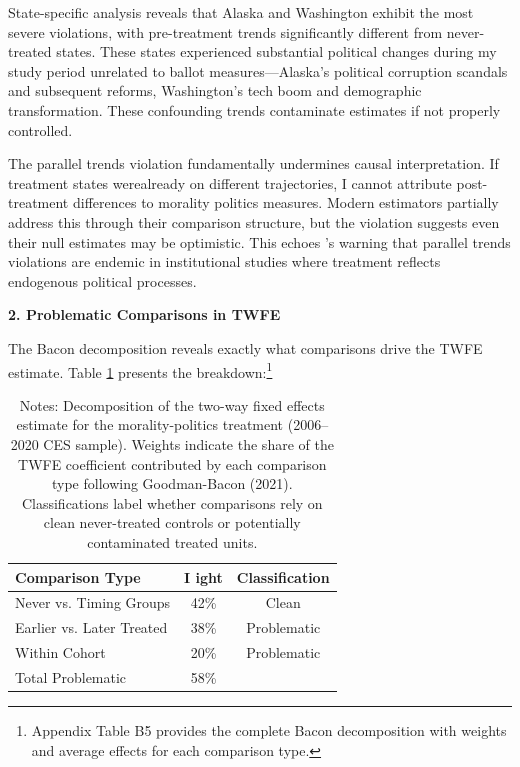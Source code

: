 \documentclass[12pt,letterpaper,oneside]{book}
\begin{document}
State-specific analysis reveals that Alaska and Washington exhibit the most severe violations, with pre-treatment trends significantly different from never-treated states. These states experienced substantial political changes during my study period unrelated to ballot measures---Alaska's political corruption scandals and subsequent reforms, Washington's tech boom and demographic transformation. These confounding trends contaminate estimates if not properly controlled.

The parallel trends violation fundamentally undermines causal interpretation. If treatment states werealready on different trajectories, I cannot attribute post-treatment differences to morality politics measures. Modern estimators partially address this through their comparison structure, but the violation suggests even their null estimates may be optimistic. This echoes \citet{kahn2020promise}'s warning that parallel trends violations are endemic in institutional studies where treatment reflects endogenous political processes.

\textbf{2. Problematic Comparisons in TWFE}

The Bacon decomposition reveals exactly what comparisons drive the TWFE estimate. Table \ref{tab:bacon_decomp} presents the breakdown:\footnote{Appendix Table B5 provides the complete Bacon decomposition with weights and average effects for each comparison type.}

\begin{table}[H]
\centering
\caption{Bacon Decomposition of TWFE Estimate}
\label{tab:bacon_decomp}
\caption*{\footnotesize Notes: Decomposition of the two-way fixed effects estimate for the morality-politics treatment (2006--2020 CES sample). Weights indicate the share of the TWFE coefficient contributed by each comparison type following Goodman-Bacon (2021). Classifications label whether comparisons rely on clean never-treated controls or potentially contaminated treated units.}
\begin{tabular}{lcc}
\hline\hline
Comparison Type & I ight & Classification \\
\hline
Never vs. Timing Groups & 42\% & Clean \\
Earlier vs. Later Treated & 38\% & Problematic \\
Within Cohort & 20\% & Problematic \\
\hline
Total Problematic & 58\% & \\
\hline\hline
\end{tabular}
\end{table}
\end{document}
